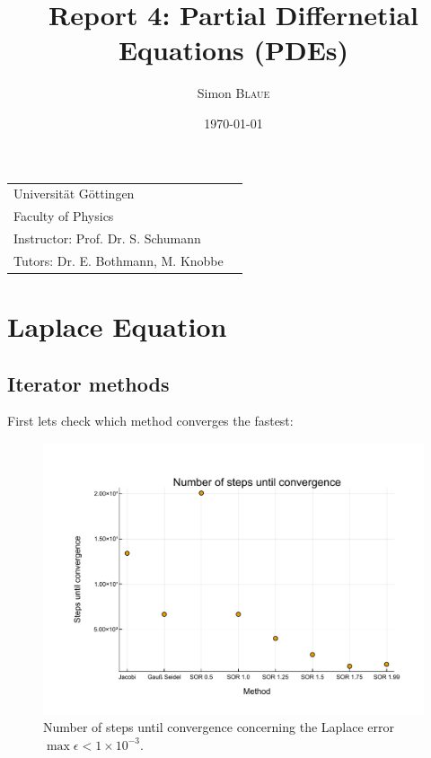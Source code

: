 \documentclass[
	a4paper, %
	10pt, %
]{CSUniSchoolLabReport}
\title{Report 4: Partial Differnetial Equations (PDEs)} %
\author{Simon \textsc{Blaue}} %
\date{\today} %
\begin{document}
\maketitle %

\vspace*{40px}

\begin{tabular}{l r}
	Universität Göttingen \\ %
	Faculty of Physics \\
	Instructor: Prof. Dr. S. Schumann \\
	Tutors: Dr. E. Bothmann, M. Knobbe \\ %
\end{tabular}



\newpage

\ohead{\pagemark}

\section{Laplace Equation}

\subsection{Iterator methods}

First lets check which method converges the fastest:

\begin{figure}[H]
	\centering
	\includegraphics[width=\textwidth]{../saves_t1/number_of_convergence_steps.pdf}
	\caption{Number of steps until convergence concerning the Laplace error $\max\epsilon<1\times 10^{-3}$.}
\end{figure}
\end{document}
